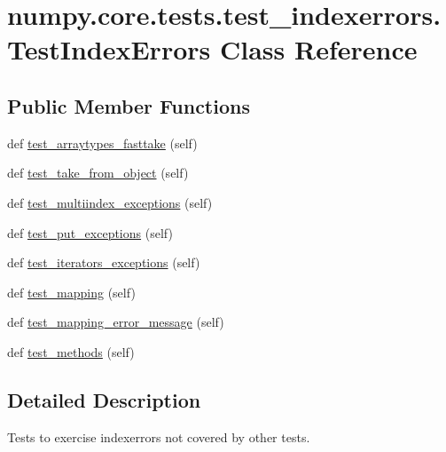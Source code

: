 \hypertarget{classnumpy_1_1core_1_1tests_1_1test__indexerrors_1_1TestIndexErrors}{}\section{numpy.\+core.\+tests.\+test\+\_\+indexerrors.\+Test\+Index\+Errors Class Reference}
\label{classnumpy_1_1core_1_1tests_1_1test__indexerrors_1_1TestIndexErrors}
\subsection*{Public Member Functions}
\begin{DoxyCompactItemize}
\item 
def \hyperlink{classnumpy_1_1core_1_1tests_1_1test__indexerrors_1_1TestIndexErrors_ab222cae2a7eab8c987f24307f8ae6b47}{test\+\_\+arraytypes\+\_\+fasttake} (self)
\item 
def \hyperlink{classnumpy_1_1core_1_1tests_1_1test__indexerrors_1_1TestIndexErrors_a448f16071707467f8e9767334acbb510}{test\+\_\+take\+\_\+from\+\_\+object} (self)
\item 
def \hyperlink{classnumpy_1_1core_1_1tests_1_1test__indexerrors_1_1TestIndexErrors_a0bca9b7033f3404d669d1a5fa96727a2}{test\+\_\+multiindex\+\_\+exceptions} (self)
\item 
def \hyperlink{classnumpy_1_1core_1_1tests_1_1test__indexerrors_1_1TestIndexErrors_ad0ceb62d0d05e3f21d5a1c5e109e2f6f}{test\+\_\+put\+\_\+exceptions} (self)
\item 
def \hyperlink{classnumpy_1_1core_1_1tests_1_1test__indexerrors_1_1TestIndexErrors_a7735129844134dcba549b0ea1a57503e}{test\+\_\+iterators\+\_\+exceptions} (self)
\item 
def \hyperlink{classnumpy_1_1core_1_1tests_1_1test__indexerrors_1_1TestIndexErrors_adfca4656a2ec0c358ff7fbd60d45dcfc}{test\+\_\+mapping} (self)
\item 
def \hyperlink{classnumpy_1_1core_1_1tests_1_1test__indexerrors_1_1TestIndexErrors_a2418be1c9c67bdbc31bd2627e7a7e326}{test\+\_\+mapping\+\_\+error\+\_\+message} (self)
\item 
def \hyperlink{classnumpy_1_1core_1_1tests_1_1test__indexerrors_1_1TestIndexErrors_adb24c458df4a4d31e5731c18c285be8c}{test\+\_\+methods} (self)
\end{DoxyCompactItemize}


\subsection{Detailed Description}
\begin{DoxyVerb}Tests to exercise indexerrors not covered by other tests.\end{DoxyVerb}
 

